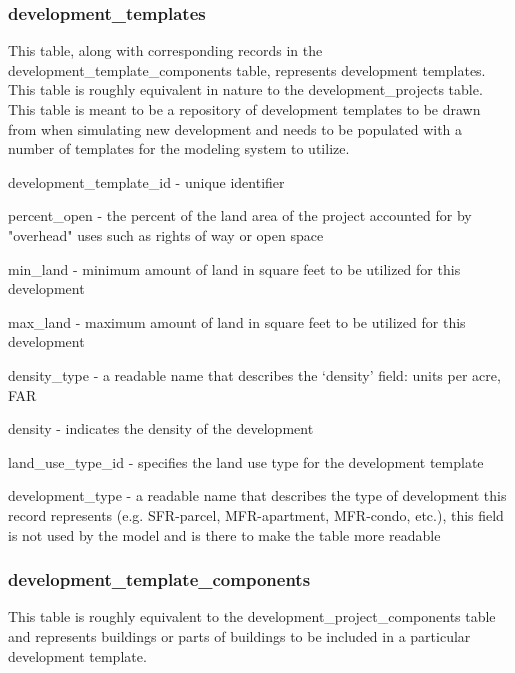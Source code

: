 \subsubsection{development\_templates} 

This table, along with corresponding records in the development\_template\_components table, represents development templates. This table is roughly equivalent in nature to the development\_projects table. This table is meant to be a repository of development templates to be drawn from when simulating new development and needs to be populated with a number of templates for the modeling system to utilize.

\begin{description}
\item development\_template\_id - unique identifier
\item percent\_open - the percent of the land area of the project accounted for by "overhead" uses such as rights of way or open space
\item min\_land - minimum amount of land in square feet to be utilized for this development
\item max\_land - maximum amount of land in square feet to be utilized for this development
\item density\_type - a readable name that describes the `density' field: units per acre, FAR
\item density - indicates the density of the development
\item land\_use\_type\_id - specifies the land use type for the development template
\item development\_type - a readable name that describes the type of development this record represents (e.g. SFR-parcel, MFR-apartment, MFR-condo, etc.), this field is not used by the model and is there to make the table more readable 
\end{description}

\subsubsection{development\_template\_components} 

This table is roughly equivalent to the development\_project\_components table and represents buildings or parts of buildings to be included in a particular development template.

